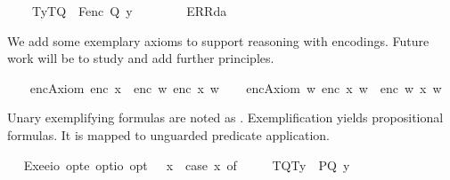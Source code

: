 \begin{isabellebody}
\ \ \ \ {\isacharparenleft}T{\isacharparenleft}y{\isacharparenright}{\isacharcomma}T{\isacharparenleft}Q{\isacharparenright}{\isacharparenright}\ {\isasymRightarrow}\ F{\isacharparenleft}{\isacharparenleft}enc\ {\isacharparenleft}Q\ y{\isacharparenright}{\isacharparenright}{\isacharparenright}\ {\isacharbar}\ \isanewline
\ \ \ \ {\isacharunderscore}\ {\isasymRightarrow}\ ERR{\isacharparenleft}da{\isacharparenright}{\isachardoublequoteclose}%
\begin{isamarkuptext}%
We add some exemplary axioms to support reasoning with encodings. Future work will
 be to study and add further principles.%
\end{isamarkuptext}\isamarkuptrue%
\ \isamarkupfalse%
\ \ encAxiom{}{\isacharcolon}\ {\isachardoublequoteopen}{\isacharparenleft}enc\ x{\isacharparenright}\ {\isasymequiv}\ enc\ {\isacharparenleft}{\isasymlambda}w{\isachardot}\ {\isacharparenleft}enc\ x\ w{\isacharparenright}{\isacharparenright}{\isachardoublequoteclose}\isanewline
\ \isamarkupfalse%
\ \ encAxiom{}{\isacharcolon}\ {\isachardoublequoteopen}{\isacharparenleft}{\isasymlambda}w{\isachardot}\ {\isasymnot}{\isacharparenleft}enc\ x\ w{\isacharparenright}{\isacharparenright}\ {\isasymequiv}\ enc\ {\isacharparenleft}{\isasymlambda}w{\isachardot}\ {\isasymnot}{\isacharparenleft}x\ w{\isacharparenright}{\isacharparenright}{\isachardoublequoteclose}%
\begin{isamarkuptext}%
Unary exemplifying formulas \isa{{\isasymPi}{\isasymkappa}} are noted as \isa{{\isasymlparr}{\isasymPi}{\isacharcomma}{\isasymkappa}{\isasymrparr}}.  
  Exemplification yields propositional formulas. 
  It is mapped to unguarded predicate application.%
\end{isamarkuptext}\isamarkuptrue%
\ \isamarkupfalse%
\ Exe{}{\isacharcolon}{\isacharcolon}{\isachardoublequoteopen}{\isacharparenleft}e{\isasymRightarrow}io{\isacharparenright}\ opt{\isasymRightarrow}e\ opt{\isasymRightarrow}io\ opt{\isachardoublequoteclose}\ {\isacharparenleft}{\isachardoublequoteopen}{\isasymlparr}{\isacharunderscore}{\isacharcomma}{\isacharunderscore}{\isasymrparr}{\isachardoublequoteclose}{\isacharparenright}\ \ {\isachardoublequoteopen}{\isasymlparr}{\isasymPhi}{\isacharcomma}x{\isasymrparr}\ {\isasymequiv}\ case\ {\isacharparenleft}{\isasymPhi}{\isacharcomma}x{\isacharparenright}\ of\ \isanewline
\ \ \ \ {\isacharparenleft}T{\isacharparenleft}Q{\isacharparenright}{\isacharcomma}T{\isacharparenleft}y{\isacharparenright}{\isacharparenright}\ {\isasymRightarrow}\ P{\isacharparenleft}{\isacharparenleft}Q\ y{\isacharparenright}{\isacharparenright}\ {\isacharbar}\ \isanewline

\end{isabellebody}
